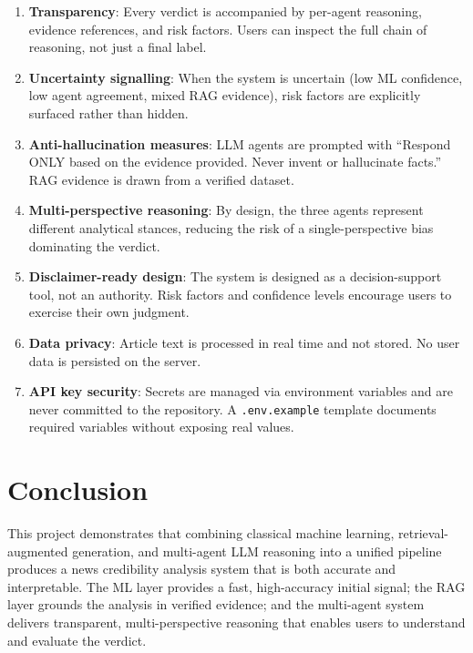 \documentclass[12pt, a4paper]{article}
\begin{document}
\begin{enumerate}[leftmargin=2em]
    \item \textbf{Transparency}: Every verdict is accompanied by
          per-agent reasoning, evidence references, and risk factors.
          Users can inspect the full chain of reasoning, not just a final
          label.
    \item \textbf{Uncertainty signalling}: When the system is uncertain
          (low ML confidence, low agent agreement, mixed RAG evidence),
          risk factors are explicitly surfaced rather than hidden.
    \item \textbf{Anti-hallucination measures}: LLM agents are prompted
          with ``Respond ONLY based on the evidence provided. Never invent
          or hallucinate facts.'' RAG evidence is drawn from a verified
          dataset.
    \item \textbf{Multi-perspective reasoning}: By design, the three
          agents represent different analytical stances, reducing the risk
          of a single-perspective bias dominating the verdict.
    \item \textbf{Disclaimer-ready design}: The system is designed as a
          decision-support tool, not an authority. Risk factors and
          confidence levels encourage users to exercise their own judgment.
    \item \textbf{Data privacy}: Article text is processed in real time
          and not stored. No user data is persisted on the server.
    \item \textbf{API key security}: Secrets are managed via environment
          variables and are never committed to the repository. A
          \texttt{.env.example} template documents required variables
          without exposing real values.
\end{enumerate}


\section{Conclusion}

This project demonstrates that combining classical machine learning,
retrieval-augmented generation, and multi-agent LLM reasoning into a
unified pipeline produces a news credibility analysis system that is both
accurate and interpretable. The ML layer provides a fast, high-accuracy
initial signal; the RAG layer grounds the analysis in verified evidence;
and the multi-agent system delivers transparent, multi-perspective
reasoning that enables users to understand and evaluate the verdict.
\end{document}
